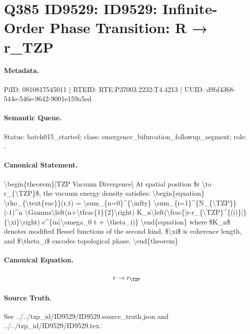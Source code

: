 \section*{Q385 ID9529: ID9529: Infinite-Order Phase Transition: R → r\_TZP}
\paragraph{Metadata.}
PiID: 0810817545011 | RTEID: RTE:P37003.2232:T4.4213 | UUID: d9bf4368-544e-546e-9642-9001e159a5ed

\paragraph{Semantic Queue.}
Status: batch015\_started; class: emergence\_bifurcation\_followup\_segment; role: .

\paragraph{Canonical Statement.}
\textbackslash{}begin\{theorem\}[TZP Vacuum Divergence] At spatial position \$r \textbackslash{}to r\_\{\textbackslash{}TZP\}\$, the vacuum energy density satisfies: \textbackslash{}begin\{equation\} \textbackslash{}rho\_\{\textbackslash{}text\{vac\}\}(r,t) = \textbackslash{}sum\_\{n=0\}\textasciicircum{}\{\textbackslash{}infty\} \textbackslash{}sum\_\{i=1\}\textasciicircum{}\{N\_\{\textbackslash{}TZP\}\} (-1)\textasciicircum{}n \textbackslash{}Gamma\textbackslash{}left(n+\textbackslash{}tfrac\{1\}\{2\}\textbackslash{}right) K\_n\textbackslash{}left(\textbackslash{}frac\{|r-r\_\{\textbackslash{}TZP\}\textasciicircum{}\{(i)\}|\}\{\textbackslash{}xi\}\textbackslash{}right) e\textasciicircum{}\{in(\textbackslash{}omega\_0 t + \textbackslash{}theta\_i)\} \textbackslash{}end\{equation\} where \$K\_n\$ denotes modified Bessel functions of the second kind, \$\textbackslash{}xi\$ is coherence length, and \$\textbackslash{}theta\_i\$ encodes topological phase. \textbackslash{}end\{theorem\}

\paragraph{Canonical Equation.}
\[
r \to r_{\TZP}
\]

\paragraph{Source Truth.}
See ../../tzp\_id/ID9529/ID9529.source\_truth.json and ../../tzp\_id/ID9529/ID9529.tex.
